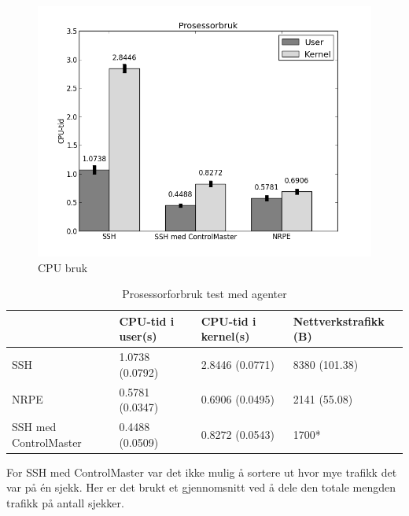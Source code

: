 

\begin{center}
\begin{figure}
    \includegraphics{img/cpu_usage.png}
    \caption{CPU bruk}
    \label{cpu_usage}
\end{figure}
\end{center}


\begin{table}
    \begin{center}
	\begin{threeparttable}
    \begin{tabular}{| l | l | l | l |} \hline
	\ & \textbf{CPU-tid i user(s)} & \textbf{CPU-tid i kernel(s)} & \textbf{Nettverkstrafikk (B)} \\ \hline
	SSH & 1.0738 (0.0792) & 2.8446 (0.0771) & 8380 (101.38) \\ \hline
	NRPE & 0.5781 (0.0347) & 0.6906 (0.0495) & 2141 (55.08) \\ \hline
	SSH med ControlMaster & 0.4488 (0.0509) & 0.8272 (0.0543) & 1700* \\ \hline
	\end{tabular}
	\begin{tablenotes}
	\small
	\item *For SSH med ControlMaster var det ikke mulig å sortere ut hvor mye trafikk det var på én sjekk. Her er det brukt et gjennomsnitt ved å dele den totale mengden trafikk på antall sjekker.
	\end{tablenotes}
	\caption{Prosessorforbruk test med agenter}
	\label{agentcheck}
	\end{threeparttable}
	\end{center}
\end{table}

